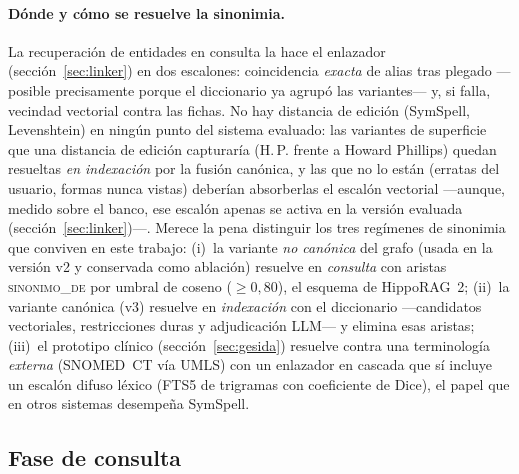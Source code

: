 \documentclass[11pt,a4paper]{article}
\newcommand{\hippo}{HippoRAG~2}
\begin{document}
\paragraph{Dónde y cómo se resuelve la sinonimia.}
La recuperación de entidades en consulta la hace el enlazador
(sección~\ref{sec:linker}) en dos escalones: coincidencia \emph{exacta} de
alias tras plegado ---posible precisamente porque el diccionario ya agrupó
las variantes--- y, si falla, vecindad vectorial contra las fichas. No hay
distancia de edición (SymSpell, Levenshtein) en ningún punto del sistema
evaluado: las variantes de superficie que una distancia de edición
capturaría (\guillemotleft{}H.\,P.\guillemotright{} frente a \guillemotleft{}Howard Phillips\guillemotright{}) quedan resueltas
\emph{en indexación} por la fusión canónica, y las que no lo están
(erratas del usuario, formas nunca vistas) deberían absorberlas el
escalón vectorial ---aunque, medido sobre el banco, ese escalón apenas se
activa en la versión evaluada (sección~\ref{sec:linker})---. Merece la pena distinguir los tres regímenes de sinonimia que
conviven en este trabajo: (i)~la variante \emph{no canónica} del grafo
(usada en la versión v2 y conservada como ablación) resuelve en
\emph{consulta} con aristas \textsc{sinonimo\_de} por umbral de coseno
($\ge 0{,}80$), el esquema de \hippo{}; (ii)~la variante canónica (v3)
resuelve en \emph{indexación} con el diccionario ---candidatos
vectoriales, restricciones duras y adjudicación LLM--- y elimina esas
aristas; (iii)~el prototipo clínico (sección~\ref{sec:gesida}) resuelve
contra una terminología \emph{externa} (SNOMED~CT vía UMLS) con un
enlazador en cascada que sí incluye un escalón difuso léxico (FTS5 de
trigramas con coeficiente de Dice), el papel que en otros sistemas
desempeña SymSpell.

\subsection{Fase de consulta}
\label{sec:consulta}
\end{document}
